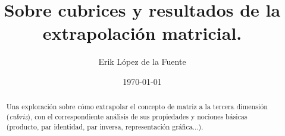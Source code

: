 \documentclass[a4paper, titlepage]{article}
\title{Sobre cubrices y resultados de la extrapolación matricial.}
\author{Erik López de la Fuente}
\date{\today}
\begin{document}
\maketitle

\begin{abstract}
	Una exploración sobre cómo extrapolar el concepto de matriz a la tercera dimensión (\textit{cubriz}), con el correspondiente análisis de sus propiedades y nociones básicas (producto, par identidad, par inversa, representación gráfica...).
\end{abstract}

\tableofcontents
\newpage


\newpage


\end{document}

